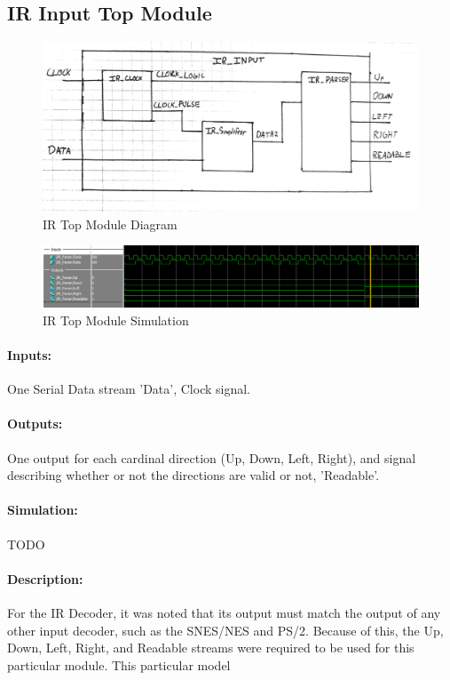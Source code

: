 \documentclass[]{article}
\begin{document}
\subsection{IR Input Top Module}
\begin{figure}[H]\centering
    \includegraphics[width=\linewidth]{figures/IR_Input_Block.jpg}
    \caption{IR Top Module Diagram}
    \label{fig:irInputDecoderBlock}
\end{figure}
\begin{figure}[H]\centering
    \includegraphics[width=\linewidth]{figures/IR_Input_Sim.PNG}
    \caption{IR Top Module Simulation}
    \label{fig:irInputDecoderSim}
\end{figure}
\paragraph{Inputs:} One Serial Data stream 'Data', Clock signal.
\paragraph{Outputs:} One output for each cardinal direction (Up, Down, Left, Right), and signal describing whether or not the directions are valid or not, 'Readable'.
\paragraph{Simulation:} TODO
\paragraph{Description:} For the IR Decoder, it was noted that its output must match the output of any other input decoder, such as the SNES/NES and PS/2.
Because of this, the Up, Down, Left, Right, and Readable streams were required to be used for this particular module. This particular model 
\end{document}
